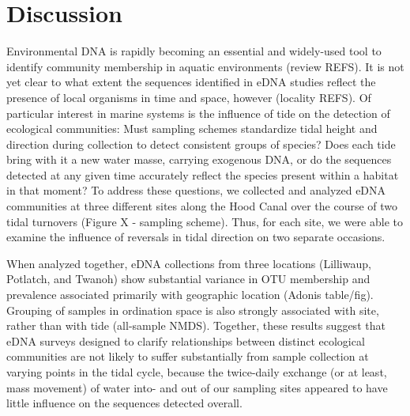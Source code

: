 \documentclass[fleqn,10pt,lineno]{wlpeerj} %
\begin{document}
\section{Discussion}\label{discussion}

Environmental DNA is rapidly becoming an essential and widely-used tool
to identify community membership in aquatic environments (review REFS).
It is not yet clear to what extent the sequences identified in eDNA
studies reflect the presence of local organisms in time and space,
however (locality REFS). Of particular interest in marine systems is the
influence of tide on the detection of ecological communities: Must
sampling schemes standardize tidal height and direction during
collection to detect consistent groups of species? Does each tide bring
with it a new water masse, carrying exogenous DNA, or do the sequences
detected at any given time accurately reflect the species present within
a habitat in that moment? To address these questions, we collected and
analyzed eDNA communities at three different sites along the Hood Canal
over the course of two tidal turnovers (Figure X - sampling scheme).
Thus, for each site, we were able to examine the influence of reversals
in tidal direction on two separate occasions.

When analyzed together, eDNA collections from three locations
(Lilliwaup, Potlatch, and Twanoh) show substantial variance in OTU
membership and prevalence associated primarily with geographic location
(Adonis table/fig). Grouping of samples in ordination space is also
strongly associated with site, rather than with tide (all-sample NMDS).
Together, these results suggest that eDNA surveys designed to clarify
relationships between distinct ecological communities are not likely to
suffer substantially from sample collection at varying points in the
tidal cycle, because the twice-daily exchange (or at least, mass
movement) of water into- and out of our sampling sites appeared to have
little influence on the sequences detected overall.
\end{document}
